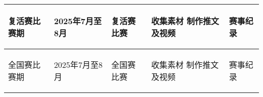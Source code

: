 \begin{longtable}{ X | X | X | X | X }
    \hline

        \begin{center}
            复活赛比赛期
        \end{center}&
        \begin{center}
            2025年7月至8月
        \end{center}&
        \begin{center}
            复活赛比赛
        \end{center}&
        \begin{center}
            收集素材
            \newline 制作推文及视频
        \end{center}&
        \begin{center}
            赛事纪录
        \end{center}\\
    
    \hline

        \begin{center}
            全国赛比赛期
        \end{center}&
        \begin{center}
            2025年7月至8月
        \end{center}&
        \begin{center}
            全国赛比赛
        \end{center}&
        \begin{center}
            收集素材
            \newline 制作推文及视频
        \end{center}&
        \begin{center}
            赛事纪录
        \end{center}\\
    
    \hline
    
\end{longtable}